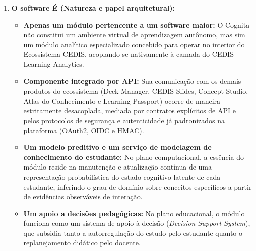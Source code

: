 \begin{enumerate}
    \item \textbf{O software É (Natureza e papel arquitetural):}
    \begin{itemize}
        \item \textbf{Apenas um módulo pertencente a um software maior:} O Cognita não constitui um ambiente virtual de aprendizagem autônomo, mas sim um módulo analítico especializado concebido para operar no interior do Ecossistema CEDIS, acoplando-se nativamente à camada do CEDIS Learning Analytics.
        \item \textbf{Componente integrado por API:} Sua comunicação com os demais produtos do ecossistema (Deck Manager, CEDIS Slides, Concept Studio, Atlas do Conhecimento e Learning Passport) ocorre de maneira estritamente desacoplada, mediada por contratos explícitos de API e pelos protocolos de segurança e autenticidade já padronizados na plataforma (OAuth2, OIDC e HMAC).
        \item \textbf{Um modelo preditivo e um serviço de modelagem de conhecimento do estudante:} No plano computacional, a essência do módulo reside na manutenção e atualização contínua de uma representação probabilística do estado cognitivo latente de cada estudante, inferindo o grau de domínio sobre conceitos específicos a partir de evidências observáveis de interação.
        \item \textbf{Um apoio a decisões pedagógicas:} No plano educacional, o módulo funciona como um sistema de apoio à decisão (\textit{Decision Support System}), que subsidia tanto a autorregulação do estudo pelo estudante quanto o replanejamento didático pelo docente.
    \end{itemize}


\end{enumerate}

